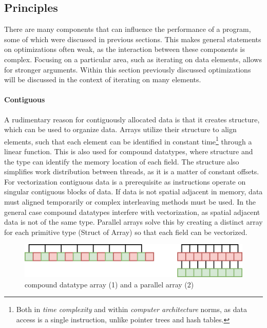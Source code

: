 \documentclass{article}
\begin{document}
\newpage

\subsection{Principles}

There are many components that can influence the performance of a program, some of which were discussed in previous sections.
This makes general statements on optimizations often weak, as the interaction between these components is complex.
Focusing on a particular area, such as iterating on data elements, allows for stronger arguments.
Within this section previously discussed optimizations will be discussed in the context of iterating on many elements.

\paragraph{Contiguous} 

A rudimentary reason for contiguously allocated data is that it creates structure, which can be used to organize data.
Arrays utilize their structure to align elements, such that each element can be identified in constant time\footnote{Both in {\it time complexity} and within {\it computer architecture} norms, as data access is a single instruction, unlike pointer trees and hash tables. } through a linear function.
This is also used for compound datatypes, where structure and the type can identify the memory location of each field.
The structure also simplifies work distribution between threads, as it is a matter of constant offsets.
For vectorization contiguous data is a prerequisite as instructions operate on singular contiguous blocks of data.
If data is not spatial adjacent in memory, data must aligned temporarily or complex interleaving methods must be used\cite{interleaved-SIMD}.
In the general case compound datatypes interfere with vectorization, as spatial adjacent data is not of the same type.
Parallel arrays solve this by creating a distinct array for each primitive type (Struct of Array) so that each field can be vectorized.

\begin{figure}[ht]
    \centering
    \includegraphics[scale=0.2]{parallelarray}
    \caption{ compound datatype array (1) and a parallel array (2) }
\end{figure}
\end{document}
